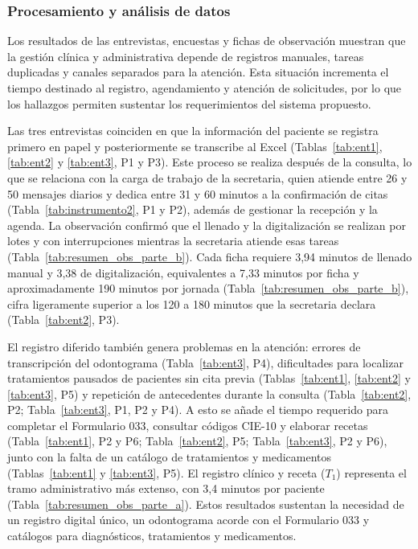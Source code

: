 \subsubsection{Procesamiento y análisis de datos}

Los resultados de las entrevistas, encuestas y fichas de observación muestran que la gestión clínica y administrativa depende de registros manuales, tareas duplicadas y canales separados para la atención. Esta situación incrementa el tiempo destinado al registro, agendamiento y atención de solicitudes, por lo que los hallazgos permiten sustentar los requerimientos del sistema propuesto.

Las tres entrevistas coinciden en que la información del paciente se registra primero en papel y posteriormente se transcribe al Excel (Tablas~\ref{tab:ent1}, \ref{tab:ent2} y \ref{tab:ent3}, P1 y P3). Este proceso se realiza después de la consulta, lo que se relaciona con la carga de trabajo de la secretaria, quien atiende entre 26 y 50 mensajes diarios y dedica entre 31 y 60 minutos a la confirmación de citas (Tabla~\ref{tab:instrumento2}, P1 y P2), además de gestionar la recepción y la agenda. La observación confirmó que el llenado y la digitalización se realizan por lotes y con interrupciones mientras la secretaria atiende esas tareas (Tabla~\ref{tab:resumen_obs_parte_b}). Cada ficha requiere 3,94 minutos de llenado manual y 3,38 de digitalización, equivalentes a 7,33 minutos por ficha y aproximadamente 190 minutos por jornada (Tabla~\ref{tab:resumen_obs_parte_b}), cifra ligeramente superior a los 120 a 180 minutos que la secretaria declara (Tabla~\ref{tab:ent2}, P3).

El registro diferido también genera problemas en la atención: errores de transcripción del odontograma (Tabla~\ref{tab:ent3}, P4), dificultades para localizar tratamientos pausados de pacientes sin cita previa (Tablas~\ref{tab:ent1}, \ref{tab:ent2} y \ref{tab:ent3}, P5) y repetición de antecedentes durante la consulta (Tabla~\ref{tab:ent2}, P2; Tabla~\ref{tab:ent3}, P1, P2 y P4). A esto se añade el tiempo requerido para completar el Formulario 033, consultar códigos CIE-10 y elaborar recetas (Tabla~\ref{tab:ent1}, P2 y P6; Tabla~\ref{tab:ent2}, P5; Tabla~\ref{tab:ent3}, P2 y P6), junto con la falta de un catálogo de tratamientos y medicamentos (Tablas~\ref{tab:ent1} y \ref{tab:ent3}, P5). El registro clínico y receta ($T_1$) representa el tramo administrativo más extenso, con 3,4 minutos por paciente (Tabla~\ref{tab:resumen_obs_parte_a}). Estos resultados sustentan la necesidad de un registro digital único, un odontograma acorde con el Formulario 033 y catálogos para diagnósticos, tratamientos y medicamentos.

